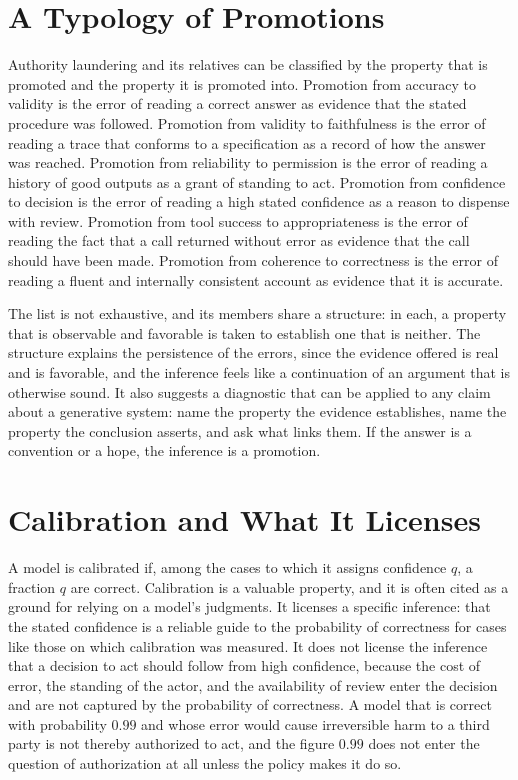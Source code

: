 \section{A Typology of Promotions}

Authority laundering and its relatives can be classified by the property that is promoted and the property it is promoted into. Promotion from accuracy to validity is the error of reading a correct answer as evidence that the stated procedure was followed. Promotion from validity to faithfulness is the error of reading a trace that conforms to a specification as a record of how the answer was reached. Promotion from reliability to permission is the error of reading a history of good outputs as a grant of standing to act. Promotion from confidence to decision is the error of reading a high stated confidence as a reason to dispense with review. Promotion from tool success to appropriateness is the error of reading the fact that a call returned without error as evidence that the call should have been made. Promotion from coherence to correctness is the error of reading a fluent and internally consistent account as evidence that it is accurate.

The list is not exhaustive, and its members share a structure: in each, a property that is observable and favorable is taken to establish one that is neither. The structure explains the persistence of the errors, since the evidence offered is real and is favorable, and the inference feels like a continuation of an argument that is otherwise sound. It also suggests a diagnostic that can be applied to any claim about a generative system: name the property the evidence establishes, name the property the conclusion asserts, and ask what links them. If the answer is a convention or a hope, the inference is a promotion.

\section{Calibration and What It Licenses}

A model is calibrated if, among the cases to which it assigns confidence $q$, a fraction $q$ are correct. Calibration is a valuable property, and it is often cited as a ground for relying on a model's judgments. It licenses a specific inference: that the stated confidence is a reliable guide to the probability of correctness for cases like those on which calibration was measured. It does not license the inference that a decision to act should follow from high confidence, because the cost of error, the standing of the actor, and the availability of review enter the decision and are not captured by the probability of correctness. A model that is correct with probability $0.99$ and whose error would cause irreversible harm to a third party is not thereby authorized to act, and the figure $0.99$ does not enter the question of authorization at all unless the policy makes it do so.

